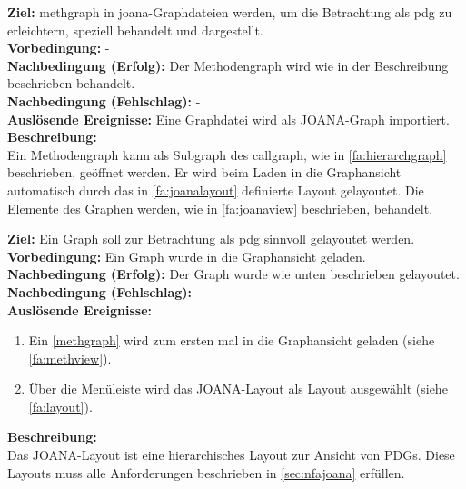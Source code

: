 \label{fa:methview}
\textbf{Ziel:} \gls{methgraph} in \gls{joana}-Graphdateien werden, um die Betrachtung als \gls{pdg} zu erleichtern, speziell behandelt und dargestellt.\\
\textbf{Vorbedingung:} -\\
\textbf{Nachbedingung (Erfolg):} Der Methodengraph wird wie in der Beschreibung beschrieben behandelt. \\
\textbf{Nachbedingung (Fehlschlag):} -\\
\textbf{Auslösende Ereignisse:} Eine Graphdatei wird als JOANA-Graph importiert.\\
\textbf{Beschreibung:}\\
Ein Methodengraph kann als \gls{Subgraph} des \gls{callgraph}, wie in \ref{fa:hierarchgraph} beschrieben, geöffnet werden.
Er wird beim Laden in die Graphansicht automatisch durch das in \ref{fa:joanalayout} definierte Layout gelayoutet.
Die Elemente des Graphen werden, wie in \ref{fa:joanaview} beschrieben, behandelt.


\label{fa:joanalayout}
\textbf{Ziel:} Ein Graph soll zur Betrachtung als \gls{pdg} sinnvoll gelayoutet werden.\\ %
\textbf{Vorbedingung:} Ein Graph wurde in die Graphansicht geladen.\\
\textbf{Nachbedingung (Erfolg):} Der Graph wurde wie unten beschrieben gelayoutet.\\
\textbf{Nachbedingung (Fehlschlag):} -\\
\textbf{Auslösende Ereignisse:}
\begin{enumerate}[nolistsep, label=(\alph*)]
  \item Ein \ref{methgraph} wird zum ersten mal in die Graphansicht geladen (siehe \ref{fa:methview}).
  \item Über die Menüleiste wird das JOANA-Layout als Layout ausgewählt (siehe \ref{fa:layout}).
\end{enumerate}
\textbf{Beschreibung:}\\
Das JOANA-Layout ist eine hierarchisches Layout zur Ansicht von PDGs.
Diese Layouts muss alle Anforderungen beschrieben in \ref{sec:nfajoana} erfüllen.

